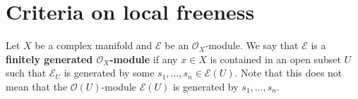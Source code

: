 \documentclass[12pt,a4paper,notitlepage]{report}
\theoremstyle{definition}
\theoremstyle{plain}
\newcommand{\mc}{\mathcal}
\newcommand{\wht}{\widehat}
\newcommand{\scr}{\mathscr}
\newcommand{\mbb}{\mathbb}
\newcommand{\blt}{\bullet}
\newcommand{\Cbb}{\mathbb C}
\numberwithin{equation}{section}
\begin{document}















\section{Criteria on local freeness}


Let $X$ be a complex manifold and $\scr E$ be an $\scr O_X$-module. We say that $\scr E$ is a \textbf{finitely generated $\scr O_X$-module} if any $x\in X$ is contained in an open subset $U$ such that $\scr E_U$ is  generated by some $s_1,\dots,s_n\in\scr E(U)$. Note that this does not mean that the $\scr O(U)$-module $\scr E(U)$ is generated by $s_1,\dots,s_n$.
\end{document}

